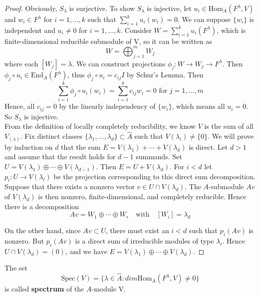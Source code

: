 \documentclass[12pt]{article}
\newenvironment{definition}[2][Definition]{\begin{trivlist}
\item[\hskip \labelsep {\bfseries #1}\hskip \labelsep {\bfseries #2.}]}{\end{trivlist}}
\begin{document}
\begin{proof}
    Obviously, $S_{\lambda}$ is surjective. To show $S_{\lambda}$ is injective, let $u_{i}\in \mathrm{Hom}_{A}(F^{\lambda},V)$ and $w_i \in F^{\lambda}$ for $i = 1,...,k$ such that $\sum_{i=1}^{k}u_i(w_i)=0$. We can suppose $\{w_i\}$ is independent and $u_i \neq 0$ for $i=1,...,k$. Consider $W=\sum_{i=1}^{k}u_i(F^{\lambda})$, which is finite-dimensional reducible submodule of V, so it can be written as $$W=\bigoplus_{j=1}^{m}W_j$$where each $[W_j]=\lambda$. We can construct projections $\phi_j: W\to W_j \to F^{\lambda}$. Then $\phi_j \circ u_i \in \mathrm{End}_A(F^{\lambda})$, thus $\phi_j \circ u_i = c_{ij} I$ by Schur's Lemma. Then
    $$
    \sum_{i=1}^k\phi_j \circ u_i(w_i) = \sum_{i=1}^kc_{ij}w_i=0\text{ for $j = 1,...,m$}
    $$
    Hence, all $c_{ij}=0$ by the linearly independency of $\{w_i\}$, which means all $u_i = 0$. So $S_{\lambda}$ is injective.\\
    
    From the definition of locally completely reducibility, we know $V$ is the sum of all $V_{(\lambda)}$. Fix distinct classes $\{\lambda_1, \ldots, \lambda_d\} \subset \widehat{A}$ such that $V(\lambda_i) \neq \{0\}$. We will prove by induction on $d$ that the sum $E = V(\lambda_1) + \cdots + V(\lambda_d)$ is direct. Let $d > 1$ and assume that the result holds for $d - 1$ summands. Set $U = V(\lambda_1) \oplus \cdots \oplus V(\lambda_{d-1})$. Then $E = U + V(\lambda_d)$. For $i < d$ let $p_i : U \longrightarrow V(\lambda_i)$ be the projection corresponding to this direct sum decomposition. Suppose that there exists a nonzero vector $v \in U \cap V(\lambda_d)$. The $A$-submodule $Av$ of $V(\lambda_d)$ is then nonzero, finite-dimensional, and completely reducible. Hence there is a decomposition
    $$
    Av = W_1 \oplus \cdots \oplus W_r \quad \text{with} \quad [W_i] = \lambda_d
    $$
    
    On the other hand, since $Av \subset U$, there must exist an $i < d$ such that $p_i(Av)$ is nonzero. But $p_i(Av)$ is a direct sum of irreducible modules of type $\lambda_i$. Hence $U \cap V(\lambda_d) = (0)$, and we have $E = V(\lambda_1) \oplus \cdots \oplus V(\lambda_d)$.
\end{proof}
\begin{definition}{6.4}
    The set
    $$\mathrm{Spec}(V)=\{\lambda\in\widehat{A}:dim\mathrm{Hom}_A(F^{\lambda},V)\neq0\}$$
    is called \textbf{spectrum} of the $A$-module V.
\end{definition}
\end{document}
